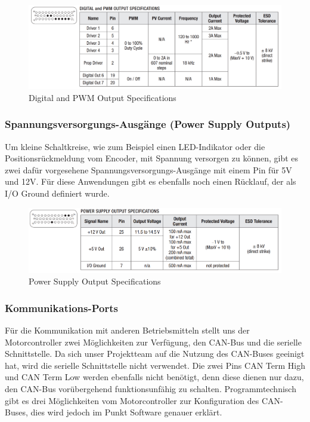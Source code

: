 \begin{figure}[H]
	\begin{center}
		\includegraphics[width=\textwidth]{figures/antrieb/Digital_PWM_Output_Specifications.png}
		\caption{Digital and PWM Output Specifications}
	\end{center}
\end{figure}



\subsubsection{Spannungsversorgungs-Ausgänge (Power Supply Outputs)}
Um kleine Schaltkreise, wie zum Beispiel einen LED-Indikator oder die Positionsrückmeldung vom Encoder, mit Spannung versorgen zu können, gibt es zwei dafür vorgesehene Spannungsversorgungs-Ausgänge mit einem Pin für 5V und 12V. Für diese Anwendungen gibt es ebenfalls noch einen Rücklauf, der als I/O Ground definiert wurde.

\begin{figure}[H]
	\begin{center}
		\includegraphics[width=\textwidth]{figures/antrieb/Power_Supply_Output_Specifications.png}
		\caption{Power Supply Output Specifications}
	\end{center}
\end{figure}


\newpage


\subsubsection{Kommunikations-Ports}
Für die Kommunikation mit anderen Betriebsmitteln stellt uns der Motorcontroller zwei Möglichkeiten zur Verfügung, den CAN-Bus und die serielle Schnittstelle. Da sich unser Projektteam auf die Nutzung des CAN-Buses geeinigt hat, wird die serielle Schnittstelle nicht verwendet. Die zwei Pins CAN Term High und CAN Term Low werden ebenfalls nicht benötigt, denn diese dienen nur dazu, den CAN-Bus vorübergehend funktionsunfähig zu schalten. Programmtechnisch gibt es drei Möglichkeiten vom Motorcontroller zur Konfiguration des CAN-Buses, dies wird jedoch im Punkt Software genauer erklärt.

